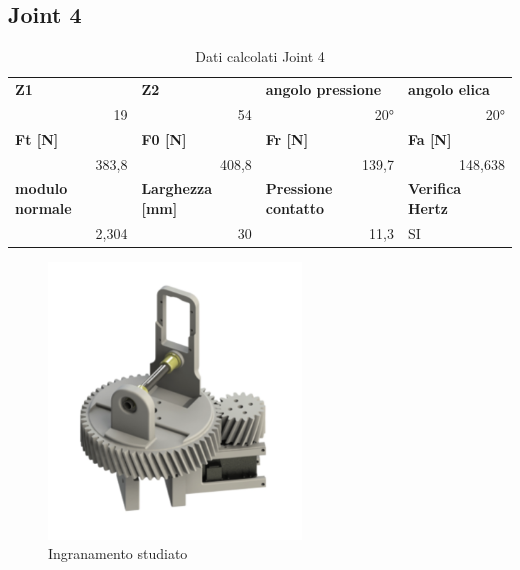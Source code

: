 \documentclass[%
corpo=11pt,
twoside,
 stile=classica,
oldstyle,
greek,%
]{toptesi}
\begin{document}
		\subsection{Joint 4}
		\begin{table}[htbp]
			\centering
			\caption{Dati calcolati Joint 4}
			\begin{tabular}{rrrl}
				\multicolumn{1}{l}{\textbf{Z1}} & \multicolumn{1}{l}{\textbf{Z2}} & \multicolumn{1}{l}{\textbf{angolo pressione}} & \textbf{angolo elica} \\
				19    & 54    & 20°    & \multicolumn{1}{r}{20°} \\
				\multicolumn{1}{l}{\textbf{Ft [N]}} & \multicolumn{1}{l}{\textbf{F0 [N]}} & \multicolumn{1}{l}{\textbf{Fr [N]}} & \textbf{Fa [N]} \\
				383,8 & 408,8 & 139,7 & \multicolumn{1}{r}{148,638} \\
				\multicolumn{1}{l}{\textbf{modulo normale}} & \multicolumn{1}{l}{\textbf{Larghezza [mm]}} & \multicolumn{1}{l}{\textbf{Pressione contatto}} & \textbf{Verifica Hertz} \\
				2,304 & 30    & 11,3  & SI \\
			\end{tabular}%
			\label{tab:lewis1}%
		\end{table}%
	
	
		\begin{figure}
			\centering
			\includegraphics[width=0.6\textwidth]{Plots/POLSO1/wrist1.png}
			\caption{Ingranamento studiato}
			\label{fig:wrist1}
		\end{figure} 
	
\end{document}
